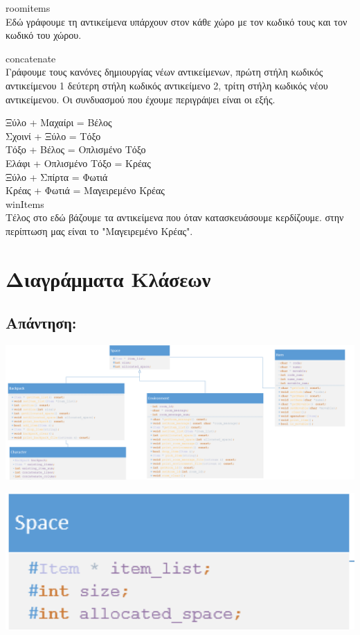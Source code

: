 \noindent
roomitems\\
Εδώ γράφουμε τη αντικείμενα υπάρχουν στον κάθε χώρο με τον κωδικό τους και 
τον κωδικό του χώρου.

\noindent
concatenate\\
Γράφουμε τους κανόνες δημιουργίας νέων αντικείμενων, πρώτη στήλη κωδικός
αντικείμενου 1 δεύτερη στήλη κωδικός αντικείμενο 2, τρίτη στήλη κωδικός νέου αντικείμενου. Οι συνδυασμού που έχουμε περιγράψει είναι οι εξής.

\noindent
Ξύλο + Μαχαίρι = Βέλος\\
Σχοινί + Ξύλο = Τόξο\\
Τόξο + Βέλος = Οπλισμένο Τόξο\\
Ελάφι + Οπλισμένο Τόξο = Κρέας\\
Ξύλο + Σπίρτα  = Φωτιά\\
Κρέας + Φωτιά = Μαγειρεμένο Κρέας\\

\noindent
winItems\\
Τέλος στο εδώ βάζουμε τα αντικείμενα που όταν κατασκευάσουμε κερδίζουμε. στην 
περίπτωση μας είναι το "Μαγειρεμένο Κρέας".

\section{Διαγράμματα Κλάσεων}
\subsection*{Απάντηση:}
\noindent

\begin{center}
			\includegraphics[width=1\textwidth]{image/1.5.0.PNG}		
\end{center}

\begin{center}
			\includegraphics[width=1\textwidth]{image/1.5.1.PNG}		
\end{center}

